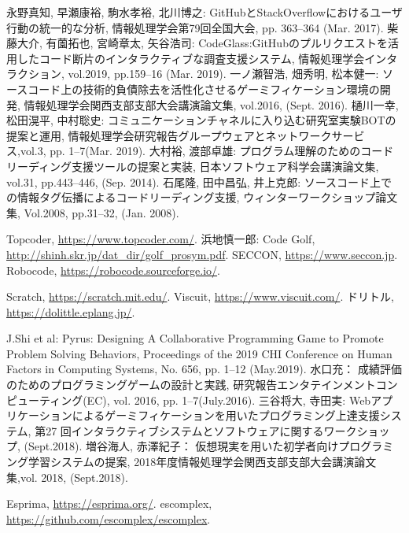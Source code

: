 \begin{thebibliography}{99}
	
	永野真知, 早瀬康裕, 駒水孝裕, 北川博之: GitHubとStackOverflowにおけるユーザ行動の統一的な分析, 情報処理学会第79回全国大会, pp. 363–364 (Mar. 2017).
	柴藤大介, 有薗拓也, 宮崎章太, 矢谷浩司: CodeGlass:GitHubのプルリクエストを活用したコード断片のインタラクティブな調査支援システム, 情報処理学会インタラクション, vol.2019, pp.159–16 (Mar. 2019).
	一ノ瀬智浩, 畑秀明, 松本健一: ソースコード上の技術的負債除去を活性化させるゲーミフィケーション環境の開発, 情報処理学会関西支部支部大会講演論文集, vol.2016, (Sept. 2016).
	樋川一幸, 松田滉平, 中村聡史: コミュニケーションチャネルに入り込む研究室実験BOTの提案と運用, 情報処理学会研究報告グループウェアとネットワークサービス,vol.3, pp. 1–7(Mar. 2019).
	大村裕, 渡部卓雄: プログラム理解のためのコードリーディング支援ツールの提案と実装, 日本ソフトウェア科学会講演論文集, vol.31, pp.443–446, (Sep. 2014).
	石尾隆, 田中昌弘, 井上克郎: ソースコード上での情報タグ伝播によるコードリーディング支援, ウィンターワークショップ論文集, Vol.2008, pp.31–32, (Jan. 2008).

	Topcoder, \url{https://www.topcoder.com/}.
	浜地慎一郎: Code Golf, \url{http://shinh.skr.jp/dat_dir/golf_prosym.pdf}.
	SECCON, \url{https://www.seccon.jp}.
	Robocode, \url{https://robocode.sourceforge.io/}.

	Scratch, \url{https://scratch.mit.edu/}.
	Viscuit, \url{https://www.viscuit.com/}.
	ドリトル, \url{https://dolittle.eplang.jp/}.


	J.Shi et al: Pyrus: Designing A Collaborative Programming Game to Promote Problem Solving Behaviors, Proceedings of the 2019 CHI Conference on Human Factors in Computing Systems, No. 656, pp. 1–12 (May.2019).
	水口充： 成績評価のためのプログラミングゲームの設計と実践, 研究報告エンタテインメントコンピューティング(EC), vol. 2016, pp. 1–7(July.2016).
	三谷将大, 寺田実: Webアプリケーションによるゲーミフィケーションを用いたプログラミング上達支援システム, 第27 回インタラクティブシステムとソフトウェアに関するワークショップ, (Sept.2018).
	増谷海人, 赤澤紀子： 仮想現実を用いた初学者向けプログラミング学習システムの提案, 2018年度情報処理学会関西支部支部大会講演論文集,vol. 2018, (Sept.2018).


	Esprima, \url{https://esprima.org/}.
	escomplex, \url{https://github.com/escomplex/escomplex}.

\end{thebibliography}